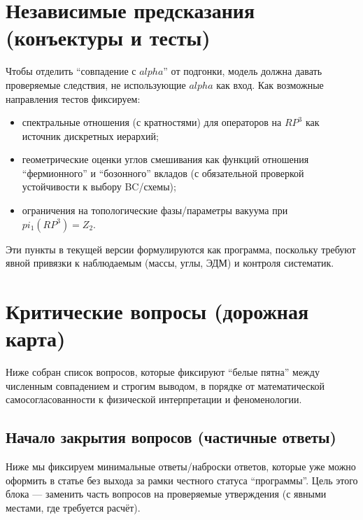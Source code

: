 \documentclass[12pt]{article}
\def\mathbb#1{#1}%
\def\alpha{alpha}%
\def\pi{pi}%
\begin{document}
\section{Независимые предсказания (конъектуры и тесты)}
Чтобы отделить ``совпадение с $\alpha$'' от подгонки, модель должна давать проверяемые следствия, не использующие $\alpha$ как вход.
Как возможные направления тестов фиксируем:
\begin{itemize}
  \item спектральные отношения (с кратностями) для операторов на $\mathbb{RP}^3$ как источник дискретных иерархий;
  \item геометрические оценки углов смешивания как функций отношения ``фермионного'' и ``бозонного'' вкладов (с обязательной проверкой устойчивости к выбору BC/схемы);
  \item ограничения на топологические фазы/параметры вакуума при $\pi_1(\mathbb{RP}^3)=\mathbb{Z}_2$.
\end{itemize}
Эти пункты в текущей версии формулируются как программа, поскольку требуют явной привязки к наблюдаемым (массы, углы, ЭДМ) и контроля систематик.

\section{Критические вопросы (дорожная карта)}
Ниже собран список вопросов, которые фиксируют ``белые пятна'' между численным совпадением и строгим выводом, в порядке от математической самосогласованности к физической интерпретации и феноменологии.

\subsection*{Начало закрытия вопросов (частичные ответы)}
Ниже мы фиксируем минимальные ответы/наброски ответов, которые уже можно оформить в статье без выхода за рамки честного статуса ``программы''.
Цель этого блока --- заменить часть вопросов на проверяемые утверждения (с явными местами, где требуется расчёт).
\end{document}
